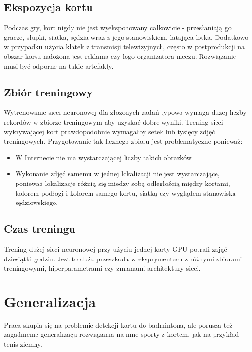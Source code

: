 \subsection*{Ekspozycja kortu}

Podczas gry, kort nigdy nie jest wyeksponowany całkowicie - przesłaniają go gracze, słupki, siatka, sędzia wraz z jego stanowiskiem, latająca lotka. Dodatkowo w przypadku użycia klatek z transmisji telewizyjnych, często w postprodukcji na obszar kortu nałożona jest reklama czy logo organizatora meczu. Rozwiązanie musi być odporne na takie artefakty.

\subsection*{Zbiór treningowy}

Wytrenowanie sieci neuronowej dla złożonych zadań typowo wymaga dużej liczby rekordów w zbiorze treningowym aby uzyskać dobre wyniki. Trening sieci wykrywającej kort prawdopodobnie wymagałby setek lub tysięcy zdjęć treningowych. Przygotowanie tak licznego zbioru jest problematyczne ponieważ:

\begin{itemize}
	\item W Internecie nie ma wystarczającej liczby takich obrazków
	\item Wykonanie zdjęć samemu w jednej lokalizacji nie jest wystarczające, ponieważ lokalizacje różnią się miedzy sobą odległością między kortami, kolorem podłogi i kolorem samego kortu, siatką czy wyglądem stanowiska sędziowskiego.
\end{itemize}

\subsection*{Czas treningu}

Trening dużej sieci neuronowej przy użyciu jednej karty GPU potrafi zająć dziesiątki godzin. Jest to duża przeszkoda w eksprymentach z różnymi zbiorami treningowymi, hiperparametrami czy zmianami architektury sieci.

\section{Generalizacja}

Praca skupia się na problemie detekcji kortu do badmintona, ale porusza też zagadnienie generalizacji rozwiązania na inne sporty z kortem, jak na przykład tenis ziemny.
